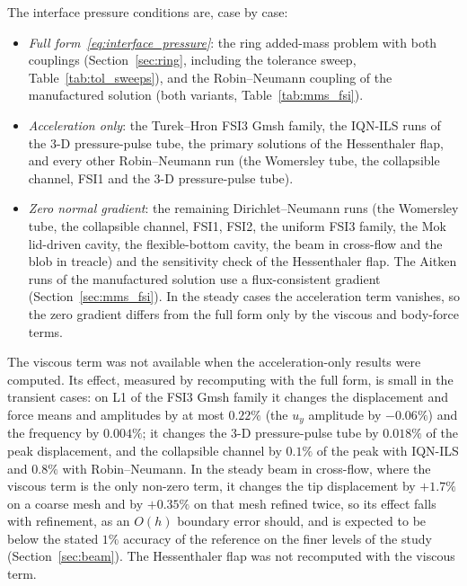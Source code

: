 The interface pressure conditions are, case by case:
\begin{itemize}
	\item \emph{Full form~\eqref{eq:interface_pressure}}: the ring added-mass problem with both couplings (Section~\ref{sec:ring}, including the tolerance sweep, Table~\ref{tab:tol_sweeps}), and the Robin--Neumann coupling of the manufactured solution (both variants, Table~\ref{tab:mms_fsi}).
	\item \emph{Acceleration only}: the Turek--Hron FSI3 Gmsh family, the IQN-ILS runs of the 3-D pressure-pulse tube, the primary solutions of the Hessenthaler flap, and every other Robin--Neumann run (the Womersley tube, the collapsible channel, FSI1 and the 3-D pressure-pulse tube).
	\item \emph{Zero normal gradient}: the remaining Dirichlet--Neumann runs (the Womersley tube, the collapsible channel, FSI1, FSI2, the uniform FSI3 family, the Mok lid-driven cavity, the flexible-bottom cavity, the beam in cross-flow and the blob in treacle) and the sensitivity check of the Hessenthaler flap. The Aitken runs of the manufactured solution use a flux-consistent gradient (Section~\ref{sec:mms_fsi}). In the steady cases the acceleration term vanishes, so the zero gradient differs from the full form only by the viscous and body-force terms.
\end{itemize}
The viscous term was not available when the acceleration-only results were computed.
Its effect, measured by recomputing with the full form, is small in the transient cases: on L1 of the FSI3 Gmsh family it changes the displacement and force means and amplitudes by at most $0.22\%$ (the $u_y$ amplitude by $-0.06\%$) and the frequency by $0.004\%$; it changes the 3-D pressure-pulse tube by $0.018\%$ of the peak displacement, and the collapsible channel by $0.1\%$ of the peak with IQN-ILS and $0.8\%$ with Robin--Neumann.
In the steady beam in cross-flow, where the viscous term is the only non-zero term, it changes the tip displacement by $+1.7\%$ on a coarse mesh and by $+0.35\%$ on that mesh refined twice, so its effect falls with refinement, as an $O(h)$ boundary error should, and is expected to be below the stated $1\%$ accuracy of the reference on the finer levels of the study (Section~\ref{sec:beam}).
The Hessenthaler flap was not recomputed with the viscous term.

